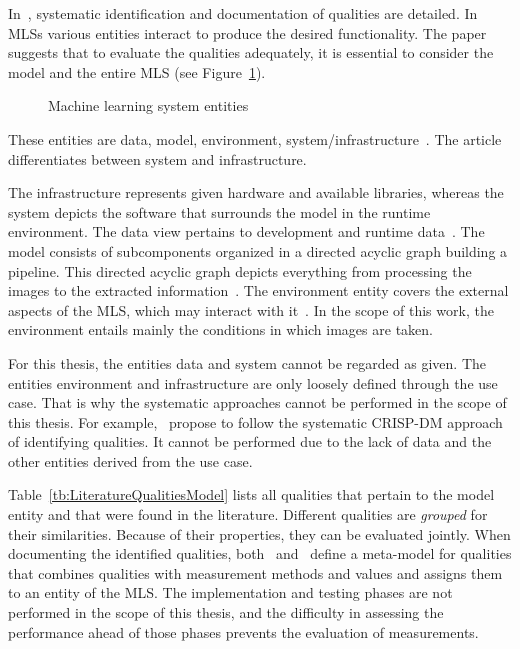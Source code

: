 In~\cite{nakamichi_requirements-driven_2020,siebert_construction_2021}, systematic
identification and documentation of qualities are detailed.
In \acp{MLS} various entities interact to produce the desired functionality.
The paper~\cite{nakamichi_requirements-driven_2020} suggests that to evaluate
the qualities adequately, it is essential to consider the model and the entire \ac{MLS}
(see Figure~\ref{fig:MLS}).
\begin{figure}[ht]
    \centering
    
    \caption[Machine learning system entities]{%
        Machine learning system entities~\citep{nakamichi_requirements-driven_2020}\label{fig:MLS}
    }
\end{figure}
These entities are data, model, environment,
system/infrastructure~\citep{nakamichi_requirements-driven_2020, siebert_construction_2021}.
The article~\cite{siebert_construction_2021} differentiates between system and infrastructure.

The infrastructure represents given hardware and available libraries, whereas the system depicts
the software that surrounds the model in the runtime environment.
The data view pertains to development and runtime data~\citep{siebert_construction_2021}.
The model consists of subcomponents organized in a directed acyclic graph building a
pipeline.
This directed acyclic graph depicts everything from processing the images to the extracted
information~\citep{siebert_construction_2021}.
The environment entity covers the external aspects of the \ac{MLS}, which may interact with
it~\citep{siebert_construction_2021}.
In the scope of this work, the environment entails mainly the conditions in which images are taken.

For this thesis, the entities data and system cannot be regarded as given.
The entities environment and infrastructure are only loosely defined through the use case.
That is why the systematic approaches cannot be performed in the scope of this thesis.
For example,~\cite{siebert_construction_2021} propose to follow the systematic CRISP-DM approach of
identifying qualities.
It cannot be performed due to the lack of data and the other entities derived from the use case.

Table~\ref{tb:LiteratureQualitiesModel} lists all qualities that pertain to the model entity
and that were found in the literature.
Different qualities are \textit{grouped} for their similarities.
Because of their properties, they can be evaluated jointly.
When documenting the identified qualities,
both~\cite{nakamichi_requirements-driven_2020} and~\cite{siebert_construction_2021} define a
meta-model for qualities that combines qualities with
measurement methods and values and assigns them to an entity of the \ac{MLS}.
The implementation and testing phases are not performed in the scope of this thesis, and the
difficulty in assessing the performance ahead of those phases prevents the evaluation
of measurements.

